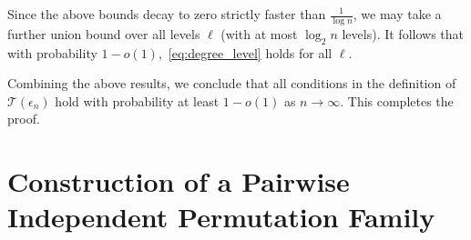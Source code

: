 \documentclass[journal]{IEEEtran}
\theoremstyle{definition}
\theoremstyle{definition}
\newcommand{\Tc}{\mathcal{T}}
\newcommand{\PP}{\mathbb{P}}
\newcommand{\PV}{\nu}
\newcommand{\kb}{\overline{k}}
\newcommand{\bigO}{\mathcal{O}}
\begin{document}
Since the above bounds decay to zero strictly faster than $\frac{1}{\log n}$, we may take a further union bound over all levels $\ell$ (with at most $\log_2 n$ levels).  It follows that with probability $1-o(1)$,~\eqref{eq:degree_level} holds for all $\ell$.

\medskip
Combining the above results, we conclude that all conditions in the definition of $\Tc(\epsilon_n)$ hold with probability at least $1-o(1)$ as $n \to \infty$.  This completes the proof.


\section{Construction of a Pairwise Independent Permutation Family}
\label{appendix:pairwise_independent}


\end{document}
